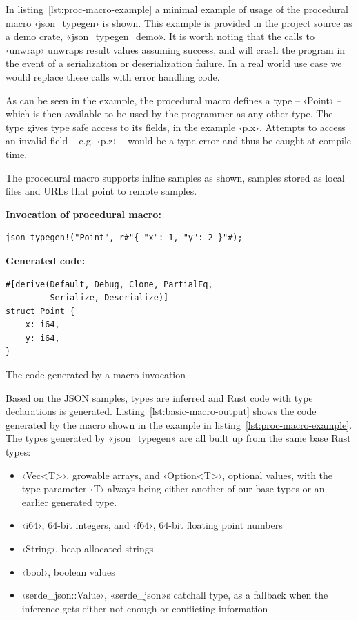 In listing~\ref{lst:proc-macro-example} a minimal example of usage of the procedural macro ‹json_typegen› is shown. This example is provided in the project source as a demo crate, «json_typegen_demo». It is worth noting that the calls to ‹unwrap› unwraps result values assuming success, and will crash the program in the event of a serialization or deserialization failure. In a real world use case we would replace these calls with error handling code.

As can be seen in the example, the procedural macro defines a type -- ‹Point› -- which is then available to be used by the programmer as any other type. The type gives type safe access to its fields, in the example ‹p.x›. Attempts to access an invalid field -- e.g. ‹p.z› -- would be a type error and thus be caught at compile time.

The procedural macro supports inline samples as shown, samples stored as local files and URLs that point to remote samples.

\begin{listing}[ht!]
\textbf{Invocation of procedural macro:}
\begin{verbatim}
json_typegen!("Point", r#"{ "x": 1, "y": 2 }"#);
\end{verbatim}
\vspace{5mm}

\textbf{Generated code:}
\begin{verbatim}
#[derive(Default, Debug, Clone, PartialEq,
         Serialize, Deserialize)]
struct Point {
    x: i64,
    y: i64,
}
\end{verbatim}
\caption{The code generated by a macro invocation}
\label{lst:basic-macro-output}
\end{listing}

Based on the JSON samples, types are inferred and Rust code with type declarations is generated. Listing~\ref{lst:basic-macro-output} shows the code generated by the macro shown in the example in listing~\ref{lst:proc-macro-example}. The types generated by «json_typegen» are all built up from the same base Rust types:

\begin{itemize}
  \item ‹Vec<T>›, growable arrays, and ‹Option<T>›, optional values, with the type parameter ‹T› always being either another of our base types or an earlier generated type.
  \item ‹i64›, 64-bit integers, and ‹f64›, 64-bit floating point numbers
  \item ‹String›, heap-allocated strings
  \item ‹bool›, boolean values
  \item ‹serde_json::Value›, «serde_json»s catchall type, as a fallback when the inference gets either not enough or conflicting information
\end{itemize}

